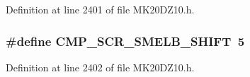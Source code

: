 Definition at line 2401 of file M\+K20\+D\+Z10.\+h.

\subsubsection[{\texorpdfstring{C\+M\+P\+\_\+\+S\+C\+R\+\_\+\+S\+M\+E\+L\+B\+\_\+\+S\+H\+I\+FT}{CMP_SCR_SMELB_SHIFT}}]{\setlength{\rightskip}{0pt plus 5cm}\#define C\+M\+P\+\_\+\+S\+C\+R\+\_\+\+S\+M\+E\+L\+B\+\_\+\+S\+H\+I\+FT~5}\hypertarget{group___c_m_p___register___masks_gac82a565c88f79f00a12f6e6799779353}{}\label{group___c_m_p___register___masks_gac82a565c88f79f00a12f6e6799779353}


Definition at line 2402 of file M\+K20\+D\+Z10.\+h.

